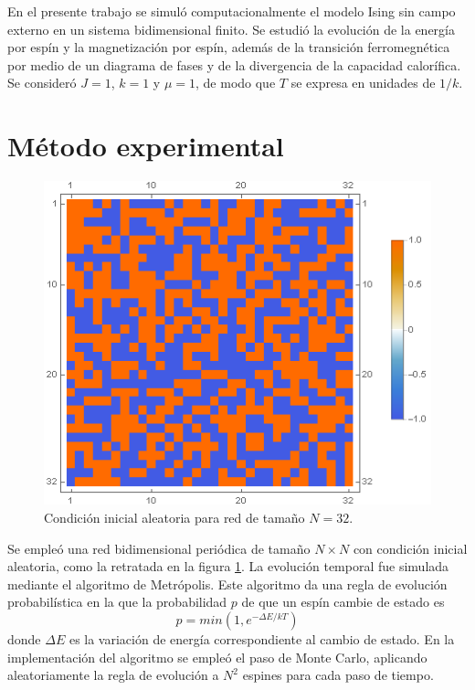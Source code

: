 \documentclass[aps,prb,twocolumn,superscriptaddress,floatfix,longbibliography]{revtex4-2}
\newcounter{para}
\begin{document}
En el presente trabajo se simuló computacionalmente el modelo Ising sin campo externo en un sistema bidimensional finito. Se estudió la evolución de la energía por espín y la magnetización por espín, además de la transición ferromegnética por medio de un diagrama de fases y de la divergencia de la capacidad calorífica. Se consideró $J = 1$, $k = 1$ y $\mu = 1$, de modo que $T$ se expresa en unidades de $1/k$.

\section{Método experimental}

\begin{figure}[h]
    \includegraphics[clip=true,width=\columnwidth]{condicion_inicial.png}
    \caption{Condición inicial aleatoria para red de tamaño $N = 32$.}
     \label{fig:condicion_inicial}
\end{figure}

Se empleó una red bidimensional periódica de tamaño $N \times N$ con condición inicial aleatoria, como la retratada en la figura \ref{fig:condicion_inicial}. La evolución temporal fue simulada mediante el algoritmo de Metrópolis. Este algoritmo da una regla de evolución probabilística en la que la probabilidad $p$ de que un espín cambie de estado es
\[p = min(1,e^{-\Delta E / k T})\]
donde $\Delta E$ es la variación de energía correspondiente al cambio de estado. En la implementación del algoritmo se empleó el paso de Monte Carlo, aplicando aleatoriamente la regla de evolución a $N^2$ espines para cada paso de tiempo.
\end{document}
